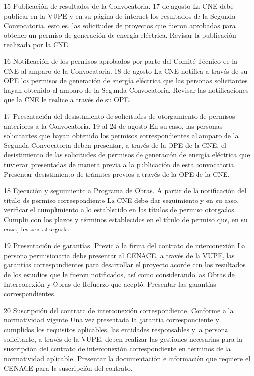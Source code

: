  15
 Publicación de resultados de la Convocatoria.
 17 de agosto
 La CNE debe publicar en la VUPE y en su página de internet los resultados de la Segunda Convocatoria, esto es, las solicitudes de proyectos que fueron aprobadas para obtener un permiso de generación de energía eléctrica.
 Revisar la publicación realizada por la CNE
 
 16
 Notificación de los permisos aprobados por parte del Comité Técnico de la CNE al amparo de la Convocatoria.
 18 de agosto
 La CNE notifica a través de su OPE los permisos de generación de energía eléctrica que las personas solicitantes hayan obtenido al amparo de la Segunda Convocatoria.
 Revisar las notificaciones que la CNE le realice a través de su OPE.
 
 17
 Presentación del desistimiento de solicitudes de otorgamiento de permisos anteriores a la Convocatoria.
 19 al 24 de agosto
 En su caso, las personas solicitantes que hayan obtenido los permisos correspondientes al amparo de la Segunda Convocatoria deben presentar, a través de la OPE de la CNE, el desistimiento de las solicitudes de permisos de generación de energía eléctrica que tuvieran presentadas de manera previa a la publicación de esta convocatoria.
 Presentar desistimiento de trámites previos a través de la OPE de la CNE.
 
 18
 Ejecución y seguimiento a Programa de Obras.
 A partir de la notificación del título de permiso correspondiente
 La CNE debe dar seguimiento y en su caso, verificar el cumplimiento a lo establecido en los títulos de permiso otorgados.
 Cumplir con los plazos y términos establecidos en el título de permiso que, en su caso, les sea otorgado.
 
 19
 Presentación de garantías.
 Previo a la firma del contrato de interconexión
 La persona permisionaria debe presentar al CENACE, a través de la VUPE, las garantías correspondientes para desarrollar el proyecto acorde con los resultados de los estudios que le fueron notificados, así como considerando las Obras de Interconexión y Obras de Refuerzo que aceptó.
 Presentar las garantías correspondientes.
 
 20
 Suscripción del contrato de interconexión correspondiente.
 Conforme a la normatividad vigente
 Una vez presentada la garantía correspondiente y cumplidos los requisitos aplicables, las entidades responsables y la persona solicitante, a través de la VUPE, deben realizar las gestiones necesarias para la suscripción del contrato de interconexión correspondiente en términos de la normatividad aplicable.
 Presentar la documentación e información que requiere el CENACE para la suscripción del contrato.
 
